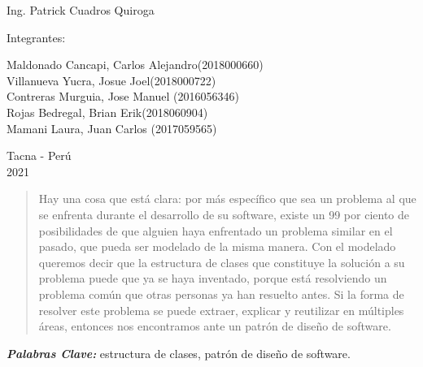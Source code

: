 \documentclass[12pt,letterpaper]{article}
\providecommand{\pclave}[1]
{
  \small	
  \textbf{\textit{Palabras Clave:}} #1
}
\begin{document}
\begin{titlepage}
\begin{center}
\vspace*{0.1in}
\begin{large}
 Ing. Patrick Cuadros Quiroga\\
\end{large}

\vspace*{0.2in}
\vspace*{0.1in}
\begin{large}
Integrantes:\\
\begin{flushleft}
Maldonado Cancapi, Carlos Alejandro\hfill(2018000660) \\
Villanueva Yucra, Josue Joel\hfill(2018000722)\\
Contreras Murguia, Jose Manuel \hfill(2016056346)\\
Rojas Bedregal, Brian Erik\hfill(2018060904)\\
Mamani Laura, Juan Carlos \hfill(2017059565)\\

\end{flushleft}
\end{large}

\vspace*{0.1in}
\begin{large}
Tacna - Perú\\
2021\\

\end{large}
\end{center}

\end{titlepage}

\begin{abstract}
    Hay una cosa que está clara: por más específico que sea un problema al que se 
    enfrenta durante el desarrollo de su software, existe un 99 por ciento de posibilidades 
    de que alguien haya enfrentado un problema similar en el pasado, que pueda ser modelado de 
    la misma manera.
    Con el modelado queremos decir que la estructura de clases que constituye la solución a su 
    problema puede que ya se haya inventado, porque está resolviendo un problema común que otras 
    personas ya han resuelto antes. Si la forma de resolver este problema se puede extraer, explicar
     y reutilizar en múltiples áreas, entonces nos encontramos ante un patrón de diseño de software.
\end{abstract}
\pclave{estructura de clases, patrón de diseño de software.}
\end{document}
